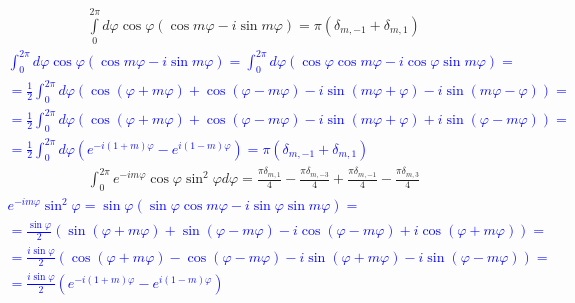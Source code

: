 %
\begin{equation} \begin{aligned} \label{eq:int_exp2}
\int \limits_{0}^{2\pi} d \varphi \cos \varphi 
( \cos m \varphi - i \sin m \varphi) = \pi ( \delta_{m,-1} + \delta_{m,1} )
\end{aligned} \end{equation}
%
\textcolor{blue}{ \begin{equation*} \begin{aligned}
\int_{0}^{2\pi} d \varphi \cos \varphi 
\left( \cos m \varphi - i \sin m \varphi \right) = \int_{0}^{2\pi} d \varphi
\left( \cos \varphi \cos m \varphi - i \cos \varphi \sin m \varphi \right) = \\
= \frac{1}{2} \int_{0}^{2\pi} d \varphi \left( 
\cos (\varphi + m \varphi) + \cos (\varphi - m \varphi) - 
i \sin (m \varphi + \varphi) - i \sin (m \varphi - \varphi) \right) = \\
= \frac{1}{2} \int_{0}^{2\pi} d \varphi \left( 
\cos (\varphi + m \varphi) + \cos (\varphi - m \varphi) - 
i \sin (m \varphi + \varphi) + i \sin (\varphi - m \varphi) \right) = \\
= \frac{1}{2} \int_{0}^{2\pi} d \varphi 
\left( e^{-i (1 + m) \varphi} - e^{i (1 - m) \varphi} \right) = 
\pi \left( \delta_{m,-1} + \delta_{m,1} \right)
\end{aligned} \end{equation*} }
%
\begin{equation} \begin{aligned} \label{eq:int_exp3}
\int_{0}^{2\pi} e^{-i m \varphi} \cos \varphi \sin^2 \varphi d \varphi = 
\frac{\pi \delta_{m,1} }{4}  - \frac{\pi \delta_{m,-3} }{4} + 
\frac{\pi \delta_{m,-1} }{4}  - \frac{\pi \delta_{m,3} }{4}
\end{aligned} \end{equation}
%
\textcolor{blue}{ \begin{equation*} \begin{aligned}
e^{-i m \varphi} \sin^2 \varphi = \sin \varphi \left( 
\sin \varphi \cos m \varphi - i \sin \varphi \sin m \varphi \right) = \\
= \frac{\sin \varphi}{2} \left( \sin (\varphi + m \varphi) + 
\sin (\varphi - m \varphi) - i \cos (\varphi - m \varphi) + 
i \cos (\varphi + m \varphi) \right) = \\ 
= \frac{i \sin \varphi}{2} \left( \cos (\varphi + m \varphi) - 
\cos (\varphi - m \varphi) - i \sin (\varphi + m \varphi) - 
i \sin (\varphi - m \varphi) \right) = \\
= \frac{i \sin \varphi}{2} \left( e^{-i(1+m)\varphi} - e^{i(1-m)\varphi} \right)
\end{aligned} \end{equation*} }
